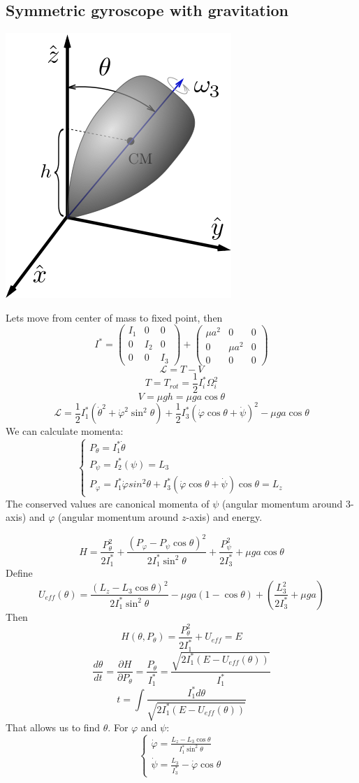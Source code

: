 \subsection{Symmetric gyroscope with gravitation}
\begin{center}
	\includegraphics[width=0.3\linewidth]{./lect24/1.png}
\end{center}
Lets move from center of mass to fixed point, then
$$I^* = \begin{pmatrix}
I_1&0&0\\0&I_2&0\\0&0&I_3
\end{pmatrix}+\begin{pmatrix}
\mu a^2&0&0\\0&\mu a^2&0\\0&0&0
\end{pmatrix}$$
$$\mathcal{L} = T -V$$
$$T = T_{rot} = \frac{1}{2}I^{*}_i \Omega_i^2$$
$$V = \mu gh = \mu ga\cos \theta$$
$$\mathcal{L} = \frac{1}{2} I^*_1 \left(\dot{\theta}^2 + \dot{\varphi}^2 \sin^2 \theta\right) + \frac{1}{2} I^*_3 \left( \dot{\varphi} \cos \theta + \dot{\psi}\right)^2 - \mu g a \cos \theta$$
We can calculate momenta:
$$\begin{cases}
P_\theta = I^*_1 \dot{\theta}\\
P_\psi = I^*_2 \left(\psi\right) = L_3\\
P_\varphi = I^*_1 \dot{\varphi} sin^2 \theta + I^*_3 \left(\dot{\varphi}  \cos \theta + \dot{\psi}\right)\cos \theta = L_z
\end{cases}$$
The conserved values are canonical momenta of $\psi$ (angular momentum around $3$-axis) and $\varphi$  (angular momentum around $z$-axis)  and energy. 

$$H  = \frac{P_\theta^2}{2I^*_1} + \frac{\left(P_\varphi - P_\psi\cos \theta\right)^2}{2I^*_1 \sin^2 \theta} + \frac{P_\psi^2}{2I^*_3} +\mu ga\cos \theta$$
Define
$$U_{eff} (\theta) = \frac{\left(L_z - L_3 \cos \theta \right)^2}{2I^*_1 \sin^2 \theta} - \mu g a (1-\cos \theta ) + \left( \frac{L_3^2}{2I^*_3}  +\mu ga  \right)$$
Then
$$H(\theta, P_\theta) = \frac{P_\theta^2}{2I^*_1} + U_{eff} = E$$
$$\frac{d\theta}{dt} = \frac{\partial H}{\partial P_\theta} = \frac{P_\theta}{I^*_1} = \frac{\sqrt{2I^*_1\left(E-U_{eff}(\theta)\right)}}{I^*_1}$$
$$t  =\int \frac{I^*_1d\theta}{\sqrt{2I^*_1\left(E-U_{eff}(\theta)\right)}}$$
That allows us to find $\theta$. For $\varphi$ and $\psi$:
$$\begin{cases}
\dot{\varphi} = \frac{L_z-L_3\cos \theta}{I^*_1 \sin^2 \theta}\\
\dot{\psi} = \frac{L_3}{I^*_3}-\dot{\varphi}\cos \theta
\end{cases}$$

